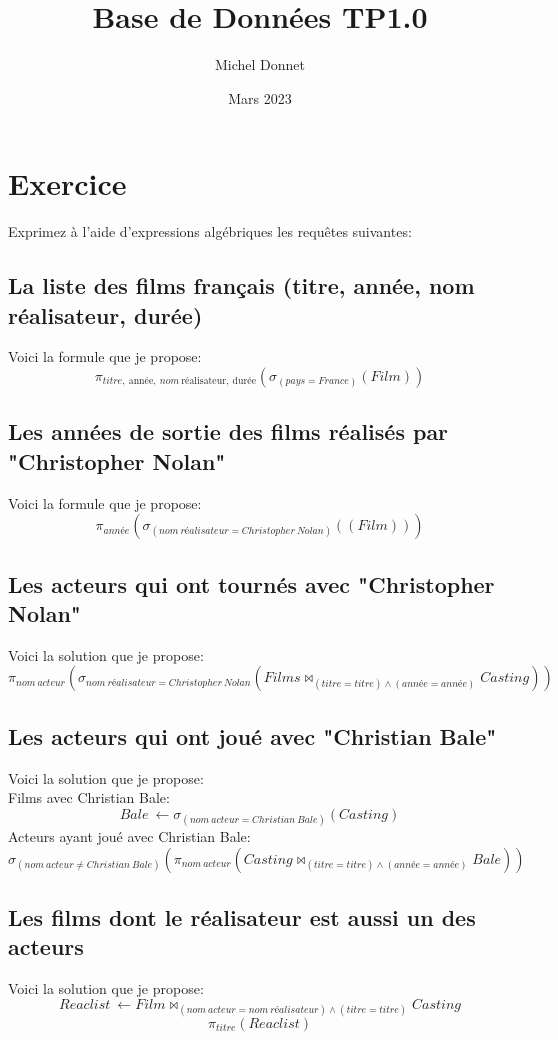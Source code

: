 \documentclass{article}
\title{Base de Données TP1.0}
\author{Michel Donnet}
\date{Mars 2023}
\begin{document}
\maketitle

\section{Exercice}
Exprimez à l'aide d'expressions algébriques les requêtes suivantes:
\subsection{La liste des films français (titre, année, nom réalisateur, durée)}
Voici la formule que je propose:
$$\pi_{titre, \:\text{année}, \:nom \:\text{réalisateur}, \:\text{durée}}(\sigma_{(pays = France)}(Film))$$

\subsection{Les années de sortie des films réalisés par "Christopher Nolan"}
Voici la formule que je propose:
$$\pi_{année}(\sigma_{(nom \:réalisateur = Christopher \:Nolan)}((Film)))$$

\subsection{Les acteurs qui ont tournés avec "Christopher Nolan"}
Voici la solution que je propose:
$$\pi_{nom \:acteur}(\sigma_{nom \:réalisateur = Christopher \:Nolan}(Films \bowtie_{(titre = titre)\wedge (année = année)} Casting))$$

\subsection{Les acteurs qui ont joué avec "Christian Bale"}
Voici la solution que je propose:\\

Films avec Christian Bale:
$$Bale\: \leftarrow \sigma_{(nom \:acteur = Christian \:Bale)}(Casting)$$
Acteurs ayant joué avec Christian Bale:
$$\sigma_{(nom \:acteur \ne Christian \:Bale)}(\pi_{nom \:acteur} (Casting \bowtie_{(titre = titre)\wedge (année = année)}Bale))$$

\subsection{Les films dont le réalisateur est aussi un des acteurs}
Voici la solution que je propose:\\
$$Reaclist \: \leftarrow Film \bowtie_{(nom \:acteur = nom \:réalisateur)\wedge (titre = titre)} Casting$$
$$\pi_{titre}(Reaclist)$$
\end{document}
